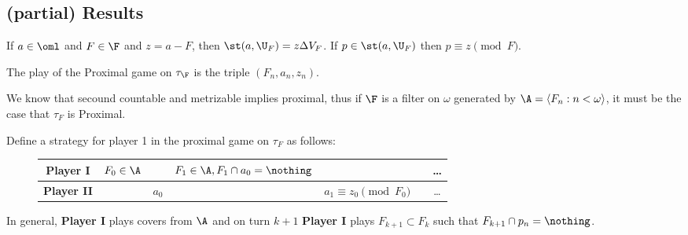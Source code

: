 \documentclass{article}
\begin{document}


\subsection{(partial) Results}

\begin{observation}
    If \(a \in \oml\) and \( F \in \F\) and \(z = a- F\), then \(\st(a, \U_F) = z\Delta V_F\). If \(p \in \st(a, \U_F)\) then \(p \equiv z \pmod F\).
\end{observation}
\begin{observation}
    The play of the Proximal game on \(\tau_{\F}\) is the triple \((F_n, a_n, z_n)\).
\end{observation}
We know that secound countable and metrizable implies proximal, thus if \(\F\) is a filter on \(\omega\) generated by \(\A = \langle F_n : n < \omega \rangle\), it must be the case that \(\tau_F\) is Proximal. 

Define a strategy for player 1 in the proximal game on \(\tau_F\) as follows:

\begin{figure}[h]
    \centering
    \begin{tabular}{|c|c|c|c|c|c|c|}
        \hline
        \textbf{Player I}  & \(F_0 \in \A\) & & \(F_1 \in \A, F_1\cap a_0 = \nothing\) & & & \dots \\
        \hline
        \textbf{Player II} & & \(a_0\) & & \(a_1 \equiv z_0 \pmod {F_0} \) & & \dots \\
        \hline
    \end{tabular}
\end{figure}
In general, \textbf{Player I} plays covers from \(\A\) and on turn \(k+1\) \textbf{Player I} plays \(F_{k + 1} \subset F_k\) such that \(F_{k + 1}\cap p_n = \nothing\).
\end{document}
